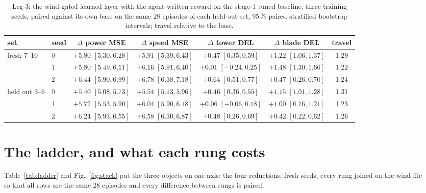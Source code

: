 \documentclass{article}
\begin{document}
\begin{table}[t]
\centering\small
\caption{Leg 3: the wind-gated learned layer with the agent-written reward on the stage-1 tuned baseline, three training seeds, paired against its own base on the same 28 episodes of each held-out set, 95\,\% paired stratified bootstrap intervals; travel relative to the base.}
\label{tab:gated}
\begin{tabular}{llccccc}
\toprule
set & seed & $\Delta$ power MSE & $\Delta$ speed MSE & $\Delta$ tower DEL & $\Delta$ blade DEL & travel \\
\midrule
fresh 7--10 & 0 & $+5.80$ $[5.30, 6.28]$ & $+5.91$ $[5.39, 6.43]$ & $+0.47$ $[0.35, 0.59]$ & $+1.22$ $[1.06, 1.37]$ & 1.29 \\
            & 1 & $+5.80$ $[5.49, 6.11]$ & $+6.16$ $[5.91, 6.40]$ & $+0.01$ $[-0.24, 0.25]$ & $+1.48$ $[1.30, 1.66]$ & 1.22 \\
            & 2 & $+6.44$ $[5.90, 6.99]$ & $+6.78$ $[6.38, 7.18]$ & $+0.64$ $[0.51, 0.77]$ & $+0.47$ $[0.26, 0.70]$ & 1.24 \\
\midrule
held out 3--6 & 0 & $+5.40$ $[5.08, 5.73]$ & $+5.54$ $[5.13, 5.96]$ & $+0.46$ $[0.36, 0.55]$ & $+1.15$ $[1.01, 1.28]$ & 1.31 \\
              & 1 & $+5.72$ $[5.53, 5.90]$ & $+6.04$ $[5.90, 6.18]$ & $+0.06$ $[-0.06, 0.18]$ & $+1.00$ $[0.76, 1.21]$ & 1.23 \\
              & 2 & $+6.24$ $[5.93, 6.55]$ & $+6.58$ $[6.30, 6.87]$ & $+0.48$ $[0.26, 0.69]$ & $+0.42$ $[0.22, 0.62]$ & 1.26 \\
\bottomrule
\end{tabular}
\end{table}

\section{The ladder, and what each rung costs}
\label{sec:stack}

Table~\ref{tab:ladder} and Fig.~\ref{fig:stack} put the three objects on one axis: the four reductions, fresh seeds, every rung joined on the wind file so that all rows are the same 28 episodes and every difference between rungs is paired.
\end{document}
